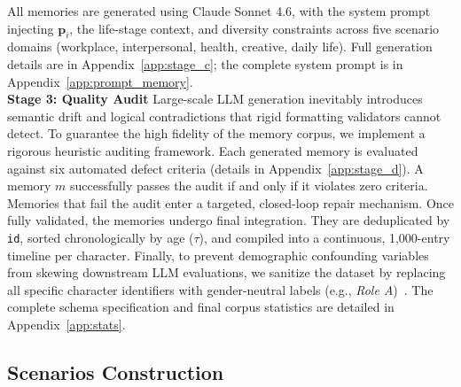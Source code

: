\documentclass{article}
\begin{document}
All memories are generated using Claude Sonnet 4.6, with the system prompt injecting $\mathbf{p}_i$, the life-stage context, and diversity constraints across five scenario domains (workplace, interpersonal, health, creative, daily life). Full generation details are in Appendix~\ref{app:stage_c}; the complete system prompt is in Appendix~\ref{app:prompt_memory}.\\
\textbf{Stage 3: Quality Audit}
Large-scale LLM generation inevitably introduces semantic drift and logical contradictions that rigid formatting validators cannot detect. To guarantee the high fidelity of the memory corpus, we implement a rigorous heuristic auditing framework. Each generated memory is evaluated against six automated defect criteria (details in Appendix~\ref{app:stage_d}). A memory $m$ successfully passes the audit if and only if it violates zero criteria.
Memories that fail the audit enter a targeted, closed-loop repair mechanism. %
Once fully validated, the memories undergo final integration. They are deduplicated by \texttt{id}, sorted chronologically by age ($\tau$), and compiled into a continuous, 1,000-entry timeline per character. Finally, to prevent demographic confounding variables from skewing downstream LLM evaluations, we sanitize the dataset by replacing all specific character identifiers with gender-neutral labels (e.g., \textit{Role A})~\citep{sun2019mitigating}. The complete schema specification and final corpus statistics are detailed in Appendix~\ref{app:stats}.

\subsection{Scenarios Construction}
\label{sec:scenario}
\end{document}
